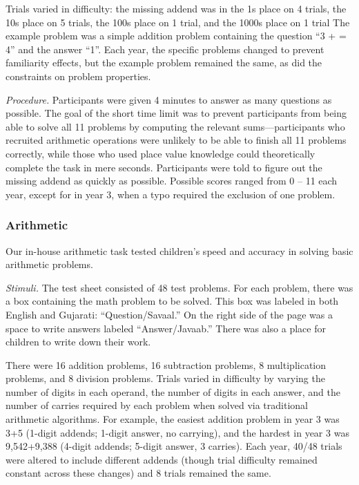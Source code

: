 \documentclass[11pt]{article}
\begin{document}
Trials varied in difficulty: the missing addend was in the 1s place on 4 trials, the 10s place on 5 trials, the 100s place on 1 trial, and the 1000s place on 1 trial The example problem was a simple addition problem containing the question ``3 + \underline{\hspace{1cm}} = 4'' and the answer ``1''. Each year, the specific problems changed to prevent familiarity effects, but the example problem remained the same, as did the constraints on problem properties.

{\it Procedure.} Participants were given 4 minutes to answer as many questions as possible. The goal of the short time limit was to prevent participants from being able to solve all 11 problems by computing the relevant sums---participants who recruited arithmetic operations were unlikely to be able to finish all 11 problems correctly, while those who used place value knowledge could theoretically complete the task in mere seconds. Participants were told to figure out the missing addend as quickly as possible. Possible scores ranged from 0 -- 11 each year, except for in year 3, when a typo required the exclusion of one problem.

\subsubsection{Arithmetic}

Our in-house arithmetic task tested children's speed and accuracy in solving basic arithmetic problems.

{\it Stimuli.} The test sheet consisted of 48 test problems. For each problem, there was a box containing the math problem to be solved. This box was labeled in both English and Gujarati: ``Question/Savaal.'' On the right side of the page was a space to write answers labeled ``Answer/Javaab.'' There was also a place for children to write down their work.

There were 16 addition problems, 16 subtraction problems, 8 multiplication problems, and 8 division problems. Trials varied in difficulty by varying the number of digits in each operand, the number of digits in each answer, and the number of carries required by each problem when solved via traditional arithmetic algorithms. For example, the easiest addition problem in year 3 was 3+5 (1-digit addends; 1-digit answer, no carrying), and the hardest in year 3 was 9,542+9,388 (4-digit addends; 5-digit answer, 3 carries). Each year, 40/48 trials were altered to include different addends (though trial difficulty remained constant across these changes) and 8 trials remained the same.
\end{document}
